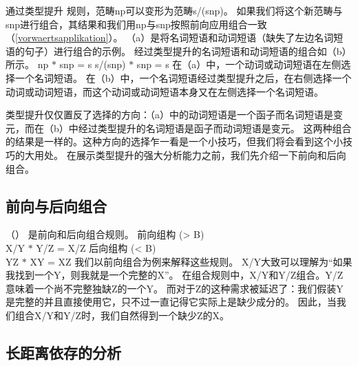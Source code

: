 \addlines[-1]
通过类型提升
规则，范畴np可以变形为范畴s/(s\bs np)。
如果我们将这个新范畴与s\bs np进行组合，其结果和我们用np与s\bs np按照前向应用组合一致（\ref{vorwaertsapplikation}）。 
（a）是将名词短语和动词短语（缺失了左边名词短语的句子）进行组合的示例。
经过类型提升的名词短语和动词短语的组合如（b）所示。
\eal
\ex np $*$ s\bs np = s 
\ex s/(s\bs np) $*$ s\bs np = s
\zl
在（a）中，一个动词或动词短语在左侧选择一个名词短语。
在（b）中，一个名词短语经过类型提升之后，在右侧选择一个动词或动词短语，而这个动词或动词短语本身又在左侧选择一个名词短语。

类型提升仅仅置反了选择的方向：（a）中的动词短语是一个函子而名词短语是变元，而在（b）中经过类型提升的名词短语是函子而动词短语是变元。
这两种组合的结果是一样的。这种方向的选择乍一看是一个小技巧，但我们将会看到这个小技巧的大用处。
在展示类型提升的强大分析能力之前，我们先介绍一下前向和后向组合。 

\subsection{前向与后向组合}
\label{Kategorialgrammatik-Komposition}

（）
是前向和后向组合规则。
\eal
\ex\label{Regel-Vorwaertskomposition}
 前向组构
 (> B)\\
    X/Y $*$ Y/Z = X/Z 
\ex 后向组构
 (< B)\\
    Y\bs Z $*$ X\bs Y = X\bs Z
\zl 
我们以前向组合为例来解释这些规则。
X/Y大致可以理解为“如果我找到一个Y，则我就是一个完整的X”。
在组合规则中，X/Y和Y/Z组合。Y/Z意味着一个尚不完整独缺Z的一个Y。
而对于Z的这种需求被延迟了：我们假装Y是完整的并且直接使用它，只不过一直记得它实际上是缺少成分的。
因此，当我们组合X/Y和Y/Z时，我们自然得到一个缺少Z的X。 

\subsection{长距离依存的分析}
\label{Abschnitt-CG-UDC}

